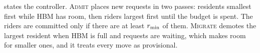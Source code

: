  states the controller. \textsc{Admit} places new requests in two passes:
residents smallest first while HBM has room, then riders largest first until the
budget is spent. The riders are committed only if there are at least $r_{\min}$ of
them.
\textsc{Migrate} demotes the largest resident when HBM is full and requests are
waiting, which makes room for smaller ones, and it treats every move as
provisional.
